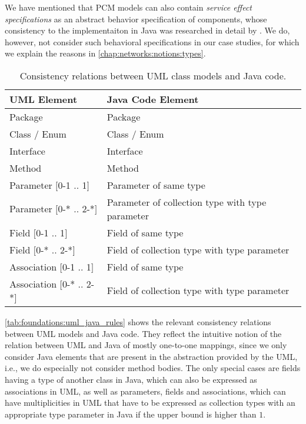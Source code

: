 We have mentioned that \gls{PCM} models can also contain \emph{service effect specifications} as an abstract behavior specification of components, whose consistency to the implementaiton in Java was researched in detail by \textcite{langhammer2017a}.
We do, however, not consider such behavioral specifications in our case studies, for which we explain the reasons in \autoref{chap:networks:notions:types}.

\begin{table}
	\centering 
    \small
    \renewcommand{\arraystretch}{1.4}
	\begin{tabular}{p{3cm} p{6.8cm}}
		\toprule
        \textbf{\gls{UML} Element}  & \textbf{Java Code Element} \\
        \midrule
        Package                         & Package\\
		Class / Enum                    & Class / Enum \\
		Interface		   	            & Interface \\
        Method                          & Method \\
        Parameter $[$0-1 .. 1$]$        & Parameter of same type \\
        Parameter $[$0-* .. 2-*$]$      & Parameter of collection type with type parameter \\
        Field $[$0-1 .. 1$]$            & Field of same type\\
        Field $[$0-* .. 2-*$]$          & Field of collection type with type parameter\\
        Association $[$0-1 .. 1$]$      & Field of same type\\
        Association $[$0-* .. 2-*$]$    & Field of collection type with type parameter\\
		\bottomrule
	\end{tabular}
	\caption[Consistency relation between \acrshort{UML} and Java]{Consistency relations between \gls{UML} class models and Java code.}
	\label{tab:foundations:uml_java_rules}
\end{table}

\autoref{tab:foundations:uml_java_rules} shows the relevant consistency relations between \gls{UML} models and Java code.
They reflect the intuitive notion of the relation between \gls{UML} and Java of mostly one-to-one mappings, since we only consider Java elements that are present in the abstraction provided by the \gls{UML}, i.e., we do especially not consider method bodies.
The only special cases are fields having a type of another class in Java, which can also be expressed as associations in \gls{UML}, as well as parameters, fields and associations, which can have multiplicities in \gls{UML} that have to be expressed as collection types with an appropriate type parameter in Java if the upper bound is higher than $1$.


